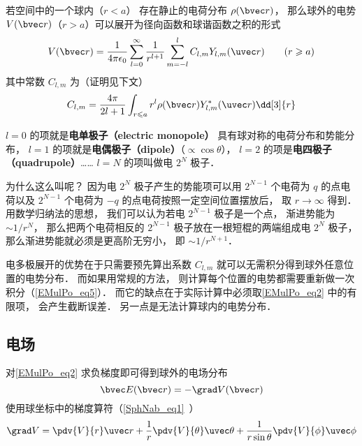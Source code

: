 

若空间中的一个球内（$r < a$） 存在静止的电荷分布 $\rho(\bvec r)$， 那么球外的电势 $V(\bvec r)$（$r > a$）可以展开为径向函数和球谐函数之积的形式
\begin{equation}\label{EMulPo_eq2}
V(\bvec r) = \frac{1}{4\pi\epsilon_0}\sum_{l = 0}^\infty \frac{1}{r^{l+1}}\sum_{m = -l}^l C_{l,m} Y_{l,m}(\uvec r) \qquad (r \geqslant a)
\end{equation}
其中常数 $C_{l,m}$ 为（证明见下文）
\begin{equation}
C_{l,m} = \frac{4\pi}{2l+1} \int_{r\leqslant a} r^l \rho(\bvec r) Y_{l,m}^*(\uvec r) \dd[3]{r}
\end{equation}

$l = 0$ 的项就是\textbf{电单极子（electric monopole）} 具有球对称的电荷分布和势能分布， $l = 1$ 的项就是\textbf{电偶极子（dipole）}（$\propto\cos \theta$）， $l = 2$ 的项是\textbf{电四极子（quadrupole）}……  $l = N$ 的项叫做电 $2^N$ 极子．

为什么这么叫呢？ 因为电 $2^N$ 极子产生的势能项可以用 $2^{N-1}$ 个电荷为 $q$ 的点电荷以及 $2^{N-1}$ 个电荷为 $-q$ 的点电荷按照一定空间位置摆放后， 取 $r \to \infty$ 得到． 用数学归纳法的思想， 我们可以认为若电 $2^{N-1}$ 极子是一个点， 渐进势能为 $\sim 1/r^N$， 那么把两个电荷相反的 $2^{N-1}$ 极子放在一根短棍的两端组成电 $2^N$ 极子， 那么渐进势能就必须是更高阶无穷小， 即 $\sim 1/r^{N+1}$．

电多极展开的优势在于只需要预先算出系数 $C_{l,m}$ 就可以无需积分得到球外任意位置的电势分布． 而如果用常规的方法， 则计算每个位置的电势都需要重新做一次积分（\autoref{EMulPo_eq5}）． 而它的缺点在于实际计算中必须取\autoref{EMulPo_eq2} 中的有限项， 会产生截断误差． 另一点是无法计算球内的电势分布．

\subsection{电场}
对\autoref{EMulPo_eq2} 求负梯度即可得到球外的电场分布
\begin{equation}
\bvec E(\bvec r) = -\grad V(\bvec r)
\end{equation}
使用球坐标中的梯度算符（\autoref{SphNab_eq1}~）
\begin{equation}
\grad V = \pdv{V}{r}\uvec r + \frac{1}{r} \pdv{V}{\theta}\uvec \theta  + \frac{1}{r\sin \theta }\pdv{V}{\phi}\uvec \phi
\end{equation}

